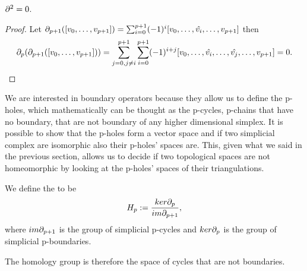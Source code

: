 \documentclass[../1.tex]{subfiles}
\begin{document}
    \begin{thm}
        $\partial^2 = 0$.
    \end{thm}
    \begin{proof}
        Let $\partial_{p+1}([v_0,\dots,v_{p+1}]) = \sum_{i=0}^{p+1} (-1)^i[v_0,\dots,\hat{v_i},\dots,v_{p+1}]$ then 
        \[\partial_p(\partial_{p+1}([v_0,\dots,v_{p+1}])) =\sum_{j=0, j \neq i}^{p+1} \sum_{i=0}^{p+1} (-1)^{i+j}[v_0,\dots,\hat{v_i},\dots,\hat{v_j},\dots,v_{p+1}] = 0.\]     
    \end{proof}

    We are interested in boundary operators because they allow us to define the p-holes, which mathematically can be thought as the
    p-cycles, p-chains that have no boundary, that are not boundary of any higher dimensional simplex. It is possible to show that the
    p-holes form a vector space and if two simplicial complex are isomorphic also their p-holes' spaces are. This, given what we said in the previous section,
    allows us to decide if two topological spaces are not homeomorphic by looking at the p-holes' spaces of their triangulations.

    \begin{defn}
        We define the  to be 
        \[H_p := \frac{ker\partial_p}{im\partial_{p+1}},\] 
        where $im\partial_{p+1}$ is the group of simplicial p-cycles and
        $ker\partial_p$ is the group of simplicial p-boundaries.
    \end{defn}

    The homology group is therefore the space of cycles that are not boundaries.
\end{document}
